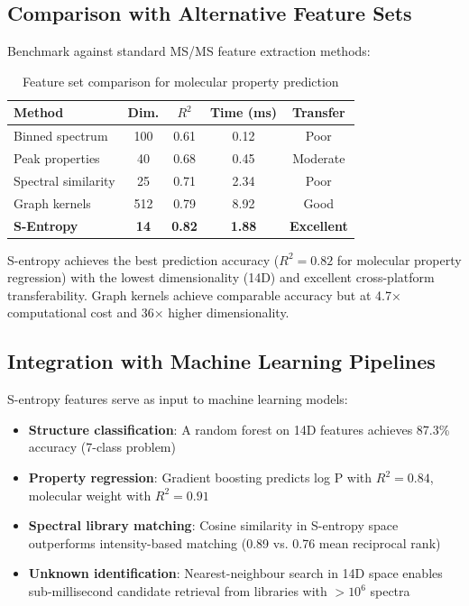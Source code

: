 \documentclass[twocolumn,10pt,a4paper]{article}
\theoremstyle{definition}
\theoremstyle{remark}
\begin{document}
\subsection{Comparison with Alternative Feature Sets}

Benchmark against standard MS/MS feature extraction methods:

\begin{table}[h]
\centering
\caption{Feature set comparison for molecular property prediction}
\label{tab:feature_comparison}
\begin{tabular}{lcccc}
\toprule
\textbf{Method} & \textbf{Dim.} & \textbf{$R^2$} & \textbf{Time (ms)} & \textbf{Transfer} \\
\midrule
Binned spectrum & 100 & 0.61 & 0.12 & Poor \\
Peak properties & 40 & 0.68 & 0.45 & Moderate \\
Spectral similarity & 25 & 0.71 & 2.34 & Poor \\
Graph kernels & 512 & 0.79 & 8.92 & Good \\
\textbf{S-Entropy} & \textbf{14} & \textbf{0.82} & \textbf{1.88} & \textbf{Excellent} \\
\bottomrule
\end{tabular}
\end{table}

S-entropy achieves the best prediction accuracy ($R^2 = 0.82$ for molecular property regression) with the lowest dimensionality (14D) and excellent cross-platform transferability. Graph kernels achieve comparable accuracy but at 4.7× computational cost and 36× higher dimensionality.

\subsection{Integration with Machine Learning Pipelines}

S-entropy features serve as input to machine learning models:

\begin{itemize}
\item \textbf{Structure classification}: A random forest on 14D features achieves 87.3\% accuracy (7-class problem)
\item \textbf{Property regression}: Gradient boosting predicts log P with $R^2 = 0.84$, molecular weight with $R^2 = 0.91$
\item \textbf{Spectral library matching}: Cosine similarity in S-entropy space outperforms intensity-based matching (0.89 vs. 0.76 mean reciprocal rank)
\item \textbf{Unknown identification}: Nearest-neighbour search in 14D space enables sub-millisecond candidate retrieval from libraries with $> 10^6$ spectra
\end{itemize}
\end{document}

